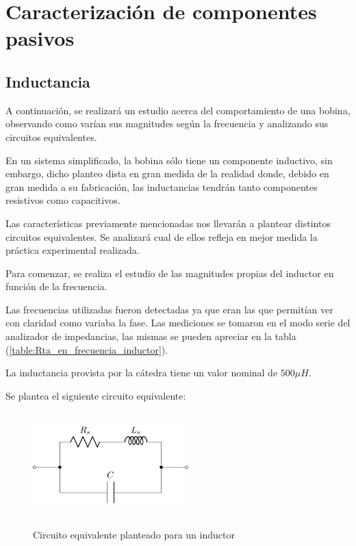 \section{Caracterización de componentes pasivos}

\subsection{Inductancia}
A continuación, se realizará un estudio acerca del comportamiento de una bobina, observando como varían sus magnitudes según la frecuencia y analizando sus circuitos equivalentes.\par En un sistema simplificado, la bobina sólo tiene un componente inductivo, sin embargo, dicho planteo dista en gran medida de la realidad donde, debido en gran medida a su fabricación, las inductancias tendrán tanto componentes resistivos como capacitivos. \par Las características previamente mencionadas nos llevarán a plantear distintos circuitos equivalentes. Se analizará cual de ellos refleja en mejor medida la práctica experimental realizada.

Para comenzar, se realiza el estudio de las magnitudes propias del inductor en función de la frecuencia. \par Las frecuencias utilizadas fueron detectadas ya que eran las que permitían ver con claridad como variaba la fase. Las mediciones se tomaron en el modo serie del analizador de impedancias, las mismas se pueden apreciar en la tabla (\ref{table:Rta_en_frecuencia_inductor}).

La inductancia provista por la cátedra tiene un valor nominal de $500\mu H$.
\par\par
Se plantea el siguiente circuito equivalente:

\begin{figure}[H]
\centering
\includegraphics[width=6cm,height=4cm]{Ejercicio_1(Germo)/Circuitos/circuito_equivalente_inductancia.pdf}
\label{fig:circuito_equivalente_inductancia}
\caption{Circuito equivalente planteado para un inductor}
\end{figure}

